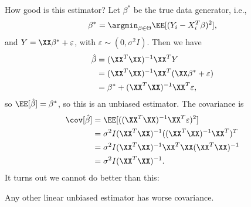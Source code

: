 How good is this estimator? Let $\beta^*$ be the true data generator, i.e., 
\[\beta^* = \argmin_{\beta\in \Theta}\EE[(Y_i - X_i^T\beta)^2],\]
and $Y = \XX \beta^* + \varepsilon$, with $\varepsilon \sim (0, \sigma^2 I)$. Then we have 
\begin{align*}
	\hat{\beta} &= (\XX^T\XX)^{-1}\XX^TY \\
							&= (\XX^T\XX)^{-1}\XX^T(\XX \beta^* + \varepsilon) \\
							&= \beta^* + (\XX^T\XX)^{-1}\XX^T\varepsilon,
\end{align*}
so $\EE[\hat{\beta}] = \beta^*$, so this is an unbiased estimator. The covariance is 
\begin{align*}
	\cov[\hat{\beta}] &= \EE[((\XX^T\XX)^{-1}\XX^T\varepsilon)^2] \\
										&= \sigma^2 I (\XX^T\XX)^{-1}((\XX^T\XX)^{-1}\XX^T)^T \\
										&= \sigma^2 I (\XX^T\XX)^{-1}\XX^T\XX(\XX^T\XX)^{-1} \\
										&= \sigma^2 I (\XX^T\XX)^{-1}.
\end{align*}
It turns out we cannot do better than this: 
\begin{theorem}

Any other linear unbiased estimator has worse covariance. 
\end{theorem}

